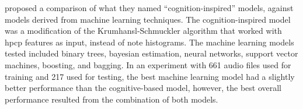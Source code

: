 \textcite{gomez2004estimating} proposed a comparison of what
they named ``cognition-inspired'' models, against models
derived from machine learning techniques. The
cognition-inspired model was a modification of the
Krumhansl-Schmuckler algorithm that worked with
\acrfull{hpcp} features as input, instead of note
histograms. The machine learning models tested included
binary trees, bayesian estimation, neural networks, support
vector machines, boosting, and bagging. In an experiment
with 661 audio files used for training and 217 used for
testing, the best machine learning model had a slightly
better performance than the cognitive-based model, however,
the best overall performance resulted from the combination
of both models.




